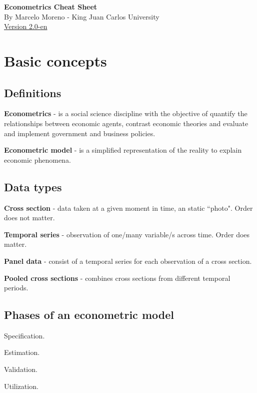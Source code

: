 \documentclass[10pt, a4paper, landscape]{extarticle}
\begin{document}
\begin{multicols}{3} %

\begin{center}
\textbf{\LARGE Econometrics Cheat Sheet} \\ {\footnotesize By Marcelo Moreno - King Juan Carlos University} \\ {\footnotesize \href{https://github.com/marcelomijas/econometrics-cheatsheet}{Version 2.0-en}}
\end{center}

\section*{Basic concepts}
\subsection*{Definitions}

\textbf{Econometrics} - is a social science discipline with the objective of quantify the relationships between economic agents, contrast economic theories and evaluate and implement government and business policies.

\textbf{Econometric model} - is a simplified representation of the reality to explain economic phenomena.

\subsection*{Data types}

\textbf{Cross section} - data taken at a given moment in time, an static ``photo". Order does not matter.

\textbf{Temporal series} - observation of one/many variable/s across time. Order does matter.

\textbf{Panel data} - consist of a temporal series for each observation of a cross section.

\textbf{Pooled cross sections} - combines cross sections from different temporal periods.

\subsection*{Phases of an econometric model}

\begin{enumerate}[leftmargin=*]
\setlength{\multicolsep}{0pt}
\begin{multicols}{2}
\item Specification.
\item Estimation.
\columnbreak
\item Validation.
\item Utilization.
\end{multicols}
\end{enumerate}


\end{multicols}
\end{document}
